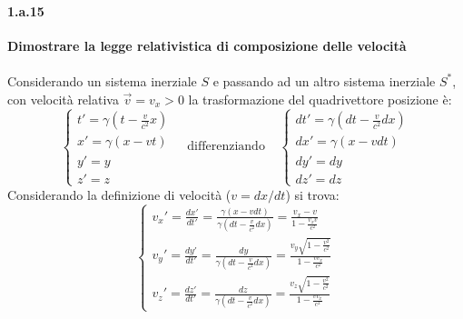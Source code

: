 \documentclass[twoside]{article}
\begin{document}
\paragraph{1.a.15} \textbf{Dimostrare la legge relativistica di composizione delle velocità 
} \\ \\
Considerando un sistema inerziale \textbf{$S$} e passando ad un altro sistema inerziale \textbf{$S^*$}, con velocità relativa $\vec{v}=v_x >0$ la trasformazione del quadrivettore posizione è:
\begin{equation*}
    \left\{ 
    \begin{matrix}
    t'=\gamma \left( t-\frac{v}{c^2}x \right) \\
    x'=\gamma(x-vt) \\
    y'=y \\
    z'=z
    \end{matrix}
    \right. \ \ \ \ \ \text{differenziando} \ \ \ \ \ \left\{ 
    \begin{matrix}
    dt'=\gamma \left( dt-\frac{v}{c^2}dx \right) \\
    dx'=\gamma(x-vdt) \\
    dy'=dy \\
    dz'=dz
    \end{matrix}
    \right.
\end{equation*}
Considerando la definizione di velocità ($v=dx/dt$) si trova:
\begin{equation*}
    \left\{ 
    \begin{matrix}
    v_x '=\frac{dx'}{dt'} =\frac{\gamma(x-vdt)}{\gamma \left( dt-\frac{v}{c^2}dx \right)}=\frac{v_x - v}{1-\frac{v_x v}{c^2}}
    \\
    v_y '=\frac{dy'}{dt'}=\frac{dy}{\gamma \left( dt-\frac{v}{c^2}dx \right)}=\frac{v_y \sqrt{1-\frac{v^2}{c^2}}}{1-\frac{v v_x}{c^2}} \\
    v_z ' =\frac{dz'}{dt'}=\frac{dz}{\gamma \left( dt-\frac{v}{c^2}dx \right)}=\frac{v_z \sqrt{1-\frac{v^2}{c^2}}}{1-\frac{v v_x}{c^2}} 
    \end{matrix}
    \right.
\end{equation*}
\end{document}
